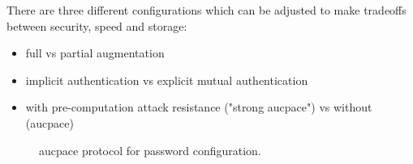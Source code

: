 There are three different configurations which can be adjusted to make tradeoffs between security, speed and storage:
\begin{itemize}
  \item{full vs partial augmentation}
  \item{implicit authentication vs explicit mutual authentication}
  \item{with pre-computation attack resistance ("strong \gls{aucpace}") vs without (\gls{aucpace})}
\end{itemize}

\begin{figure}[H]

  \caption{\gls{aucpace} protocol for password configuration.}
  \label{fig:aucpace-store-pwd}
\end{figure}

